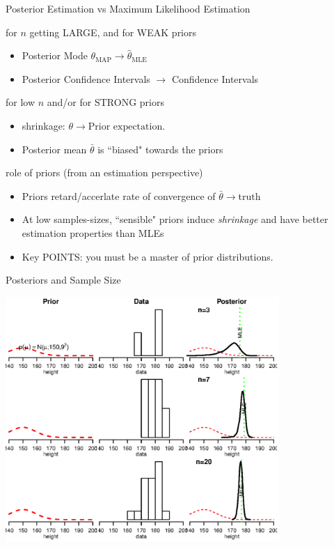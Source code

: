 \documentclass[presentation,9pt,xcolor=dvipsnames]{beamer}
\begin{document}
\begin{frame}[label={sec:org906d453}]{Posterior Estimation vs Maximum Likelihood Estimation}
\begin{block}{for \(n\) getting \alert{LARGE}, and for \alert{WEAK} priors}
\begin{itemize}
\item Posterior Mode \(\theta_{\text{MAP}}\rightarrow\hat{\theta}_{\text{MLE}}\)
\item Posterior Confidence Intervals \(\rightarrow\) Confidence Intervals
\end{itemize}
\end{block}
\begin{block}{for \alert{low} \(n\) and/or for \alert{STRONG} priors}
\begin{itemize}
\item shrinkage:  \(\theta\rightarrow\text{Prior expectation}\).
\item Posterior mean \(\bar{\theta}\) is ``biased" towards the priors
\end{itemize}
\end{block}
\begin{block}{role of priors (from an estimation perspective)}
\begin{itemize}
\item Priors retard/accerlate rate of convergence of \(\bar{\theta}\rightarrow\text{truth}\)
\item At low samples-sizes, ``sensible" priors induce \emph{shrinkage} and have better estimation properties than MLEs
\item \alert{Key POINTS}: you must be a master of prior distributions.
\end{itemize}
\end{block}
\end{frame}
\begin{frame}[label={sec:org68774f2}]{Posteriors and Sample Size}
\begin{center}
\includegraphics[width=0.78\textwidth,height=0.78\textheight]{priorinfro.eps}
\end{center}
\end{frame}
\end{document}
